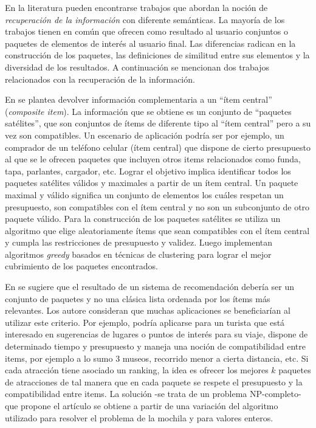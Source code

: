En la literatura pueden encontrarse trabajos que abordan la noción de \emph{recuperación de la información} con diferente semánticas. La mayoría de los trabajos tienen en común que ofrecen como resultado al usuario conjuntos o paquetes de elementos de interés al usuario final. Las diferencias radican en la construcción de los paquetes, las definiciones de similitud entre sus elementos y la diversidad de los resultados. A continuación se mencionan dos trabajos relacionados con la recuperación de la información.

En \cite{BasuRoy:2010:CEC:1807167.1807258} se plantea devolver información complementaria a un ``ítem central'' (\textit{composite item}). La información que se obtiene es un conjunto de ``paquetes satélites'', que son conjuntos de ítems de diferente tipo al ``ítem central'' pero a su vez son compatibles. Un escenario de aplicación podría ser por ejemplo, un comprador de un teléfono celular (ítem central) que dispone de cierto presupuesto al que se le ofrecen paquetes que incluyen otros items relacionados como funda, tapa, parlantes, cargador, etc. Lograr el objetivo implica identificar todos los paquetes satélites válidos y maximales a partir de un ítem central. Un paquete maximal y válido significa un conjunto de elementos los cuáles respetan un presupuesto, son compatibles con el ítem central y no son un subconjunto de otro paquete válido. Para la construcción de los paquetes satélites se utiliza un algoritmo que elige aleatoriamente ítems que sean compatibles con el ítem central y cumpla las restricciones de presupuesto y validez. Luego implementan algoritmos \emph{greedy} basados en técnicas de clustering para lograr el mejor cubrimiento de los paquetes encontrados.

En \cite{Xie:2010:BOB:1864708.1864739} se sugiere que el resultado de un sistema de recomendación debería ser un conjunto de paquetes y no una clásica lista ordenada por los ítems más relevantes. Los autore consideran que muchas aplicaciones se beneficiarían al utilizar este criterio. Por ejemplo, podría aplicarse para un turista que está interesado en sugerencias de lugares o puntos de interés para su viaje, dispone de determinado tiempo y presupuesto y maneja una noción de compatibilidad entre items, por ejemplo a lo sumo 3 museos, recorrido menor a cierta distancia, etc. Si cada atracción tiene asociado un ranking, la idea es ofrecer los mejores $k$ paquetes de atracciones de tal manera que en cada paquete se respete el presupuesto y la compatibilidad entre items. La solución -se trata de un problema NP-completo- que propone el artículo se obtiene a partir de una variación del  algoritmo utilizado para resolver el problema de la mochila \cite{DBLP:conf/coco/Karp72} y \cite{Gossett:2009:DMP:1717238} para valores enteros. 

